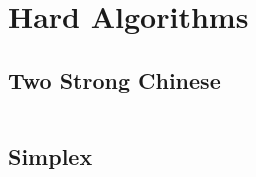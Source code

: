 \section{Hard Algorithms}

\subsection{Two Strong Chinese}

\inputminted{cpp}{code/2_strong_chinese_answer.cpp}

\subsection{Simplex}

\inputminted{cpp}{code/simplex20.cpp}
